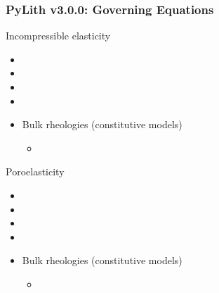 \documentclass[aspectratio=169]{beamer}
\begin{document}
\begin{frame}
  \frametitle{PyLith v3.0.0: Governing Equations}
  \summary{}

  Incompressible elasticity
  \begin{itemize}
  \item {}
  \item {}
  \item {}
  \item {}
  \item Bulk rheologies (constitutive models)
    \begin{itemize}
    \item {}
    \end{itemize}
  \end{itemize}

  \vfill
  Poroelasticity
  \begin{itemize}
  \item {}
  \item {}
  \item {}
  \item {}
  \item Bulk rheologies (constitutive models)
    \begin{itemize}
    \item {}
    \end{itemize}
  \end{itemize}
  \hfill%
  \begin{minipage}{0.25\textwidth}
    \\
    \\
  \end{minipage}  

\end{frame}
\end{document}

